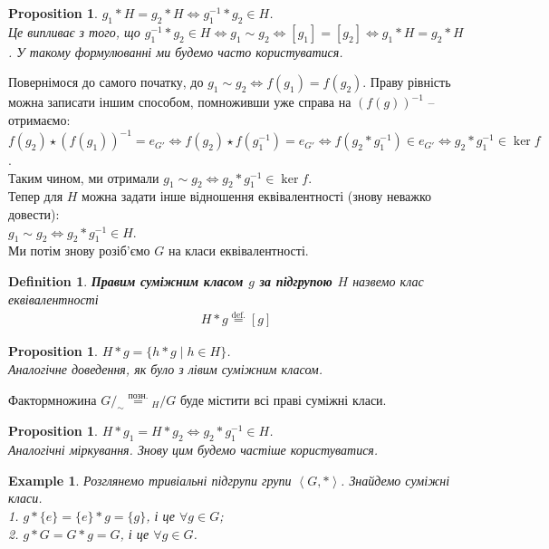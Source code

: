 \documentclass[a4paper, 10pt]{article}
\theoremstyle{theoremdd}
\theoremstyle{theoremdd}
\newtheorem{definition}[theorem]{Definition}
\theoremstyle{theoremdd}
\theoremstyle{theoremdd}
\theoremstyle{theoremdd}
\newtheorem{example}[theorem]{Example}
\theoremstyle{theoremdd}
\theoremstyle{theoremdd}
\theoremstyle{theoremdd}
\theoremstyle{theoremdd}
\newtheorem{proposition}[theorem]{Proposition}
\theoremstyle{theoremdd}
\theoremstyle{theoremdd}
\theoremstyle{theoremdd}
\theoremstyle{theoremdd}
\theoremstyle{theoremdd}
\theoremstyle{theoremdd}
\newcommand{\eqbydef}{\overset{\text{def.}}{=}}
\begin{document}
\begin{proposition}
$g_1 * H = g_2 * H \iff g_1^{-1}*g_2 \in H$.\\
\textit{Це випливає з того, що $g_1^{-1}*g_2 \in H \iff g_1 \sim g_2 \iff [g_1] = [g_2] \iff g_1*H = g_2*H$. У такому формулюванні ми будемо часто користуватися.}
\end{proposition}

Повернімося до самого початку, до $g_1 \sim g_2 \iff f(g_1) = f(g_2)$. Праву рівність можна записати іншим способом, помноживши уже справа на $(f(g))^{-1}$ -- отримаємо:\\
$f(g_2) \star (f(g_1))^{-1} = e_{G'} \iff f(g_2) \star f(g_1^{-1}) = e_{G'} \iff f(g_2*g_1^{-1}) \in e_{G'} \iff g_2*g_1^{-1} \in \ker f$.\\
Таким чином, ми отримали $g_1 \sim g_2 \iff g_2*g_1^{-1} \in \ker f$.
\bigskip \\
Тепер для $H$ можна задати інше відношення еквівалентності (знову неважко довести):\\
$g_1 \sim g_2 \iff g_2*g_1^{-1} \in H$.\\
Ми потім знову розіб'ємо $G$ на класи еквівалентності.

\begin{definition}
\textbf{Правим суміжним класом $g$ за підгрупою $H$} назвемо клас еквівалентності
\begin{align*}
H*g \eqbydef [g]
\end{align*}
\end{definition}

\begin{proposition}
$H*g = \{ h*g \mid h \in H \}$.\\
\textit{Аналогічне доведення, як було з лівим суміжним класом.}
\end{proposition}

Фактормножина $G/_{\sim} \overset{\text{позн.}}{=} {}_{H}{/G}$ буде містити всі праві суміжні класи.

\begin{proposition}
$H * g_1 = H * g_2 \iff g_2*g_1^{-1} \in H$.\\
\textit{Аналогічні міркування. Знову цим будемо частіше користуватися.}
\end{proposition}

\begin{example}
Розглянемо тривіальні підгрупи групи $\left<G,* \right>$. Знайдемо суміжні класи.\\
1. $g*\{e\} = \{e\}*g = \{g\}$, і це $\forall g \in G$;\\
2. $g*G = G*g = G$, і це $\forall g \in G$.
\end{example}
\end{document}
